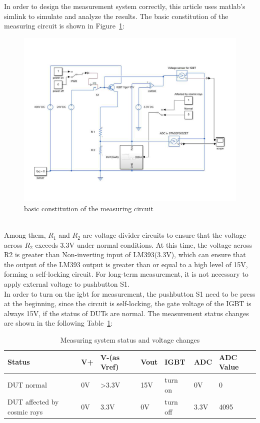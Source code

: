 In order to design the measurement system correctly, this article uses matlab's simlink to simulate and analyze the results.
The basic constitution of the measuring circuit is shown in Figure~\ref{fig:3.3}:
\begin{figure}[!ht]
	\centering
	\includegraphics[width=17cm]{grafiken/3.3.pdf}
	\caption{basic constitution of the measuring circuit} 
	\label{fig:3.3}
\end{figure}
\FloatBarrier
\\
Among them, $R_{1}$ and $R_{2}$ are voltage divider circuits to ensure that the voltage across $R_{2}$ exceeds 3.3V under normal conditions. At this time, the voltage across R2 is greater than Non-inverting input of LM393(3.3V), which can ensure that the output of the LM393 output is greater than or equal to a high level of 15V, forming a self-locking circuit. For long-term measurement, it is not necessary to apply external voltage to pushbutton S1.
\\
In order to turn on the igbt for measurement, the pushbutton S1 need to be press 
at the beginning, since the circuit is self-locking, the gate voltage of the IGBT is always 15V, if the status of DUTs are normal. The measurement
status changes are shown in the following Table~\ref{tab:3.1}:
 
\begin{table}[]
\begin{tabular}{@{}|l|l|l|l|l|l|l|@{}}
\toprule
\rowcolor[HTML]{EFEFEF} 
Status                      & V+ & V-(as Vref) & Vout & IGBT     & ADC  & ADC Value \\ \midrule
DUT normal                  & 0V & >3.3V       & 15V  & turn on  & 0V   & 0         \\ \midrule
DUT affected by cosmic rays & 0V & 3.3V        & 0V   & turn off & 3.3V & 4095      \\ \bottomrule
\end{tabular}
	\caption{Measuring system status and voltage changes}
	\label{tab:3.1}
\end{table}

